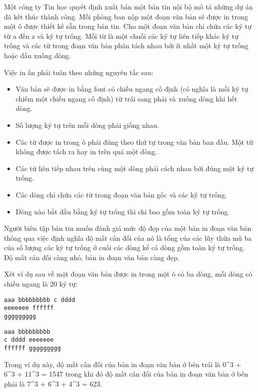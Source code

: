 



   Một công ty Tin học quyết định xuất bản một bản tin nội bộ mô tả những dự án đã kết thúc thành công. Mỗi phòng ban nộp một đoạn văn bản sẽ được in trong một ô được thiết kế sẵn trong bản tin. Cho một đoạn văn bản chỉ chứa các ký tự từ a đến z và ký tự trống. Mỗi từ là một chuỗi các ký tự liên tiếp khác ký tự trống và các từ trong đoạn văn bản phân tách nhau bởi ít nhất một ký tự trống hoặc dấu xuống dòng.  

   Việc in ấn phải tuân theo những nguyên tắc sau:  
\begin{itemize}
	\item     Văn bản sẽ được in bằng font có chiều ngang cố định (có nghĩa là mỗi ký tự chiếm một chiều ngang cố định) từ trái sang phải và xuống dòng khi hết dòng.   
	\item     Số lượng ký tự trên mỗi dòng phải giống nhau.   
	\item     Các từ được in trong ô phải đúng theo thứ tự trong văn bản ban đầu. Một từ không được tách ra hay in trên quá một dòng.   
	\item     Các từ liên tiếp nhau trên cùng một dòng phải cách nhau bởi đúng một ký tự trống.   
	\item     Các dòng chỉ chứa các từ trong đoạn văn bản gốc và các ký tự trống.   
	\item     Dòng nào bắt đầu bằng ký tự trống thì chỉ bao gồm toàn ký tự trống.   
\end{itemize}

   Người biên tập bản tin muốn đánh giá mức độ đẹp của một bản in đoạn văn bản thông qua việc định nghĩa  độ mất cân đối của nó là tổng của các lũy thừa mũ ba của số lượng các ký tự trống ở cuối các dòng kể cả dòng gồm toàn ký tự trống. Độ mất cân đối càng nhỏ, bản in đoạn văn bản càng đẹp.  

   Xét ví dụ sau về một đoạn văn bản được in trong một ô có ba dòng, mỗi dòng có chiều ngang là 20 ký tự:  
\begin{verbatim}
aaa bbbbbbbbb c dddd
eeeeeee ffffff
ggggggggg		
\end{verbatim}
\begin{verbatim}
aaa bbbbbbbbb      
c dddd eeeeeee       
ffffff ggggggggg
\end{verbatim}

   Trong ví dụ này, độ mất cân đối của bản in đoạn văn bản ở bên trái là 0\textasciicircum3 + 6\textasciicircum3 + 11\textasciicircum3 = 1547 trong khi đó độ mất cân đối của bản in đoạn văn bản ở bên phải là 7\textasciicircum3 + 6\textasciicircum3 + 4\textasciicircum3 = 623.  

